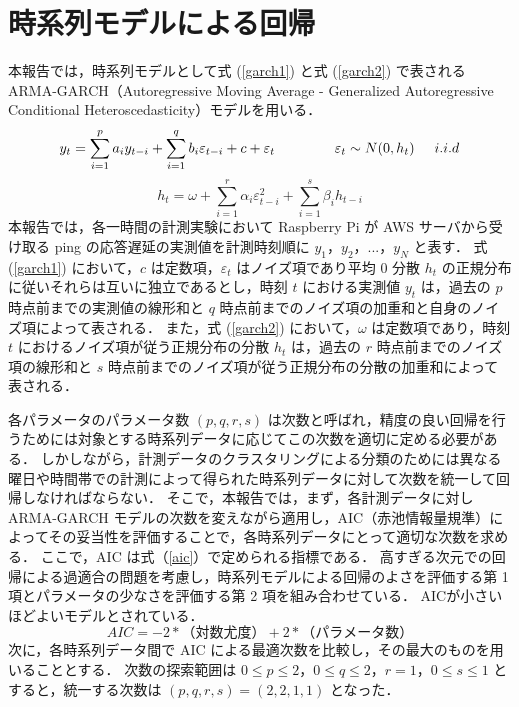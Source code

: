 \documentclass[a4j]{jarticle}
\begin{document}
\section{時系列モデルによる回帰}
本報告では，時系列モデルとして式 (\ref{garch1}) と式 (\ref{garch2}) で表される ARMA-GARCH（Autoregressive Moving Average - Generalized Autoregressive Conditional Heteroscedasticity）モデルを用いる．
\begin{equation}
y_t = \sum_{i=1}^p a_i y_{t-i} + \sum_{i=1}^q b_i \varepsilon_{t-i} + c + \varepsilon_{t} \hspace{1.5cm}\varepsilon_t \sim N(0,h_t) \hspace{0.5cm} i.i.d
\label{garch1}
\end{equation}
\begin{equation}
\displaystyle h_{t} = \omega + \sum_{i=1}^{r}\alpha_i\varepsilon_{t-i}^2 + \sum_{i=1}^{s}\beta_ih_{t-i}
\label{garch2}
\end{equation}
本報告では，各一時間の計測実験において Raspberry Pi が AWS サーバから受け取る ping の応答遅延の実測値を計測時刻順に $y_1$，$y_2$，...，$y_N$ と表す．
式 (\ref{garch1}) において，$c$ は定数項，$\varepsilon_t$ はノイズ項であり平均 0 分散 $h_t$ の正規分布に従いそれらは互いに独立であるとし，時刻 $t$ における実測値 $y_t$ は，過去の $p$ 時点前までの実測値の線形和と $q$ 時点前までのノイズ項の加重和と自身のノイズ項によって表される．
また，式 (\ref{garch2}) において，$\omega$ は定数項であり，時刻 $t$ におけるノイズ項が従う正規分布の分散 $h_t$ は，過去の $r$ 時点前までのノイズ項の線形和と $s$ 時点前までのノイズ項が従う正規分布の分散の加重和によって表される．

各パラメータのパラメータ数 $(p,q,r,s)$ は次数と呼ばれ，精度の良い回帰を行うためには対象とする時系列データに応じてこの次数を適切に定める必要がある．
しかしながら，計測データのクラスタリングによる分類のためには異なる曜日や時間帯での計測によって得られた時系列データに対して次数を統一して回帰しなければならない．
そこで，本報告では，まず，各計測データに対し ARMA-GARCH モデルの次数を変えながら適用し，AIC（赤池情報量規準）によってその妥当性を評価することで，各時系列データにとって適切な次数を求める．
ここで，AIC は式（\ref{aic}）で定められる指標である．
高すぎる次元での回帰による過適合の問題を考慮し，時系列モデルによる回帰のよさを評価する第 1 項とパラメータの少なさを評価する第 2 項を組み合わせている．
AICが小さいほどよいモデルとされている．
\begin{equation}
AIC = -2 *（対数尤度）+2 *（パラメータ数）
\label{aic}
\end{equation}
次に，各時系列データ間で AIC による最適次数を比較し，その最大のものを用いることとする．
次数の探索範囲は $0 \le p \le 2$，$0 \le q \le 2$，$r = 1$，$0 \le s \le 1$ とすると，統一する次数は $(p,q,r,s) = (2,2,1,1)$ となった．
\end{document}
